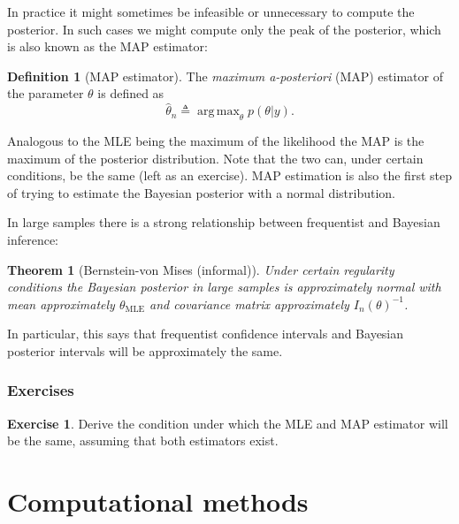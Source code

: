 \documentclass{book}
\theoremstyle{plain}%
\newtheorem{theorem}{Theorem}[section]
\theoremstyle{definition}
\newtheorem{definition}{Definition}[section]
\newtheorem{exercise}{Exercise}[chapter]
\DeclareMathOperator*{\argmax}{arg\,max}
\begin{document}
In practice it might sometimes be infeasible or unnecessary to compute the posterior. In such cases we might compute only the peak of the posterior, which is also known as the MAP estimator:

\begin{definition}[MAP estimator]
The \textit{maximum a-posteriori} (MAP) estimator of the parameter $\theta$ is defined as $$\hat{\theta}_n \triangleq \displaystyle\argmax_\theta p(\theta |y).$$
\end{definition}

Analogous to the MLE being the maximum of the likelihood the MAP is the maximum of the posterior distribution. Note that the two can, under certain conditions, be the same (left as an exercise). MAP estimation is also the first step of trying to estimate the Bayesian posterior with a normal distribution. 

In large samples there is a strong relationship between frequentist and Bayesian inference:

\begin{theorem}[Bernstein-von Mises (informal)] Under certain regularity conditions the Bayesian posterior in large samples is approximately normal with mean approximately $\theta_\text{MLE}$ and covariance matrix approximately $I_n(\theta)^{-1}$.
\end{theorem}

In particular, this says that frequentist confidence intervals and Bayesian posterior intervals will be approximately the same.

\section*{Exercises}

\begin{exercise}
Derive the condition under which the MLE and MAP estimator will be the same, assuming that both estimators exist.
\end{exercise}



%
%



\part{Computational methods}
\end{document}
